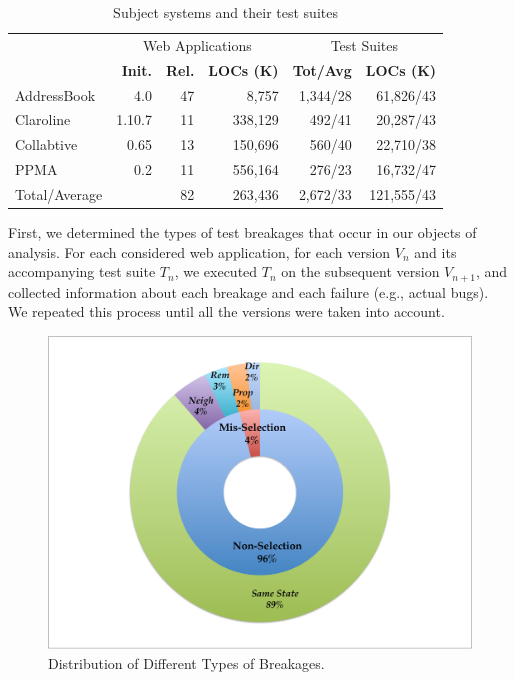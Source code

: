 \begin{table}[h]
\setlength{\tabcolsep}{2pt}
\renewcommand{\arraystretch}{0.9}
\centering
\caption{Subject systems and their test suites}
\begin{tabular}{lrrr@{\hskip 2em}r@{\hskip 1em}r}
\toprule

& \multicolumn{3}{c}{\sc Web Applications} 
& \multicolumn{2}{c}{\sc Test Suites} \\

\cmidrule(r){2-4} \cmidrule(r){5-6}

& {\textbf{Init.}} 
& {\textbf{Rel.}}
& {\textbf{LOCs (K)}} 
& {\textbf{Tot/Avg}} 
& {\textbf{LOCs (K)}}   \\

\midrule
AddressBook   & 4.0       & 47       & 8,757   & 1,344/28        & 61,826/43          \\
Claroline     & 1.10.7    & 11       & 338,129 & 492/41        & 20,287/43          \\
Collabtive    & 0.65      & 13       & 150,696 & 560/40        & 22,710/38          \\
PPMA          & 0.2       & 11       & 556,164 & 276/23        & 16,732/47          \\
\midrule
Total/Average &           & 82       & 263,436 & 2,672/33        & 121,555/43 \\

\bottomrule
\end{tabular}
\label{table:subjectSystems}
\end{table}

\label{sec:procedure}
First, we determined the types of test breakages that occur in our objects of analysis. For each considered web application, for each version $V_n$ and its accompanying test suite $T_n$, we executed $T_n$ on the subsequent version $V_{n+1}$, and collected information about each breakage and each failure (e.g., actual bugs). We repeated this process until all the versions were taken into account. 

\begin{figure}[t]
\centering
\includegraphics[trim={0cm 0cm 0cm 0cm},clip,scale=0.23]{images/donut}
\caption{Distribution of Different Types of Breakages.}
\label{donut}
\end{figure}


